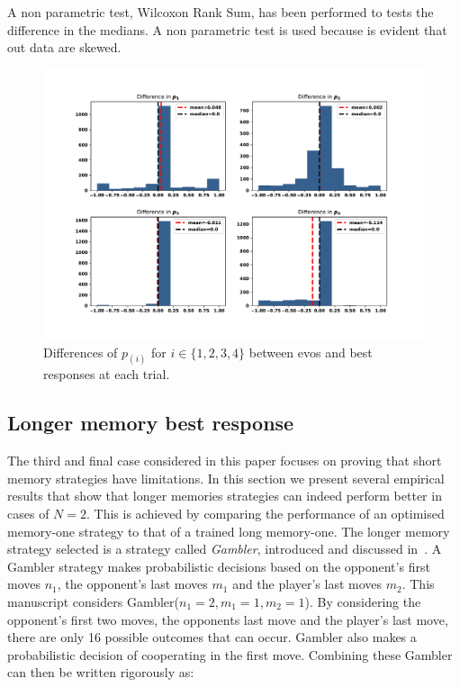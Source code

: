 \documentclass[10pt]{article}
\begin{document}
\begin{table}
    \centering
    \resizebox{.61\columnwidth}{!}{%
    }
    \caption{A non parametric test, Wilcoxon Rank Sum, has been performed to
    tests the difference in the medians. A non parametric test is used because
    is evident that out data are skewed.}\label{table:wilcoxon_tests}
\end{table}

\begin{figure}[!htbp]
    \centering
    \includegraphics[width=.8\textwidth]{img/distances.pdf}
    \caption{Differences of \(p_{(i)}\) for \(i \in \{1, 2, 3, 4\}\) between evos
    and best responses at each trial.}
    \label{fig:distances}
\end{figure}

\begin{center}
\resizebox{.41\columnwidth}{!}{%
}
\end{center}

\subsection{Longer memory best response}

The third and final case considered in this paper focuses on proving that short
memory strategies have limitations. In this section we present several empirical
results that show that longer memories strategies can indeed perform better in
cases of \(N=2\). This is achieved by comparing the performance of an optimised
memory-one strategy to that of a trained long memory-one. The longer memory
strategy selected is a strategy called \textit{Gambler}, introduced and
discussed in~\cite{Harper2017}. A Gambler strategy makes probabilistic decisions
based on the opponent's first moves \(n_1\), the opponent's last moves \(m_1\)
and the player's last moves \(m_2\). This manuscript considers Gambler($n_1 = 2,
m_1 = 1, m_2 = 1$). By considering the opponent's first two moves, the opponents
last move and the player's last move, there are only 16 possible outcomes that
can occur. Gambler also makes a probabilistic decision of cooperating in the
first move. Combining these Gambler can then be written rigorously as:
\end{document}
